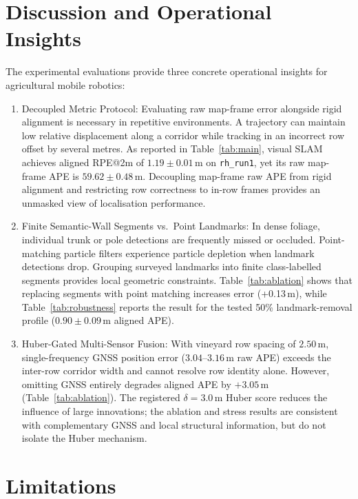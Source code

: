 \documentclass[letterpaper, 10 pt, conference]{ieeeconf}
\begin{document}
\section{Discussion and Operational Insights}
\label{sec:discussion}

The experimental evaluations provide three concrete operational insights for agricultural mobile robotics:
\begin{enumerate}
  \item Decoupled Metric Protocol: Evaluating raw map-frame error alongside rigid alignment is necessary in repetitive environments. A trajectory can maintain low relative displacement along a corridor while tracking in an incorrect row offset by several metres. As reported in Table~\ref{tab:main}, visual SLAM achieves aligned RPE@2m of $1.19\pm0.01\,$m on \texttt{rh\_run1}, yet its raw map-frame APE is $59.62\pm0.48\,$m. Decoupling map-frame raw APE from rigid alignment and restricting row correctness to in-row frames provides an unmasked view of localisation performance.
  \item Finite Semantic-Wall Segments vs.\ Point Landmarks: In dense foliage, individual trunk or pole detections are frequently missed or occluded. Point-matching particle filters experience particle depletion when landmark detections drop. Grouping surveyed landmarks into finite class-labelled segments provides local geometric constraints. Table~\ref{tab:ablation} shows that replacing segments with point matching increases error (+0.13\,m), while Table~\ref{tab:robustness} reports the result for the tested 50\% landmark-removal profile ($0.90\pm0.09\,$m aligned APE).
  \item Huber-Gated Multi-Sensor Fusion: With vineyard row spacing of $2.50\,$m, single-frequency GNSS position error ($3.04\text{--}3.16\,$m raw APE) exceeds the inter-row corridor width and cannot resolve row identity alone. However, omitting GNSS entirely degrades aligned APE by $+3.05\,$m (Table~\ref{tab:ablation}). The registered $\delta=3.0\,$m Huber score reduces the influence of large innovations; the ablation and stress results are consistent with complementary GNSS and local structural information, but do not isolate the Huber mechanism.
\end{enumerate}

\section{Limitations}
\label{sec:limitations}
\end{document}
